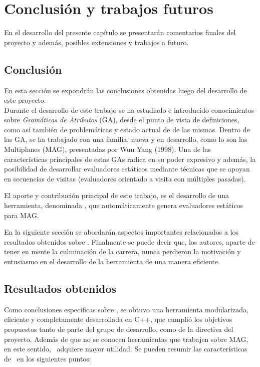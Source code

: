 \chapter{Conclusión y trabajos futuros}
\label{chap:conclusiones}

\minitoc

En el desarrollo del presente capítulo se presentarán comentarios finales del proyecto y además, posibles extensiones y trabajos a futuro.

\section{Conclusión}

En esta sección se expondrán las conclusiones obtenidas luego del desarro\-llo de este proyecto.\\

Durante el desarrollo de este trabajo se ha estudiado e introducido conocimientos sobre \textit{Gramáticas de Atributos} (GA), desde el punto de vista de definiciones, como así también de problemáticas y estado actual de de las mismas. Dentro de las GA, se ha trabajado con una familia, nueva y en desarrollo, como lo son las Multiplanes (MAG), presentadas por Wuu Yang (1998). Una de las características principales de estas GAs radica en su poder expresivo  y además, la posibilidad de desarrollar evaluadores estáticos mediante técnicas que se apoyan en secuencias de visitas (evaluadores orientado a visita con múltiples pasadas). 

El aporte y contribución principal de este trabajo, es el desarrollo de una herramienta, denominada \maggen, que automáticamente genera evaluadores estáticos para MAG.

En la siguiente sección se abordarán aspectos importantes relacionados a los resultados obtenidos sobre \maggen. Finalmente se puede decir que, los autores, aparte de tener en mente la culminación de la carrera, nunca perdieron la motivación y entusiasmo en el desarrollo de la herramienta de una manera eficiente.

\section{Resultados obtenidos}

Como conclusiones específicas sobre \maggen, se obtuvo una herramienta modularizada, eficiente y completamente desarrollada en C++, que cumplió los objetivos propuestos tanto de parte del grupo de desarrollo, como de la directiva del proyecto. Además de que no se conocen herramientas que trabajen sobre MAG, en este sentido, \maggen\ adquiere mayor utilidad. Se pueden resumir las características de \maggen\ en los siguientes puntos:

